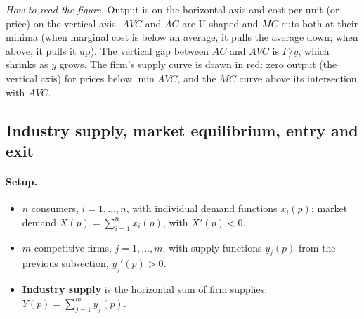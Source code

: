 \begin{center}
\end{center}
\textit{How to read the figure.} Output is on the horizontal axis and cost per unit (or price) on the vertical axis. $AVC$ and $AC$ are U-shaped and $MC$ cuts both at their minima (when marginal cost is below an average, it pulls the average down; when above, it pulls it up). The vertical gap between $AC$ and $AVC$ is $F/y$, which shrinks as $y$ grows. The firm's supply curve is drawn in red: zero output (the vertical axis) for prices below $\min AVC$, and the $MC$ curve above its intersection with $AVC$.

\subsection{Industry supply, market equilibrium, entry and exit }

\paragraph{Setup.}
\begin{itemize}
\item $n$ consumers, $i=1,\dots,n$, with individual demand functions $x_i(p)$; market demand $X(p)=\sum_{i=1}^n x_i(p)$, with $X'(p)<0$.
\item $m$ competitive firms, $j=1,\dots,m$, with supply functions $y_j(p)$ from the previous subsection, $y_j'(p)>0$.
\item \textbf{Industry supply} is the horizontal sum of firm supplies: $Y(p)=\sum_{j=1}^m y_j(p)$.
\end{itemize}

